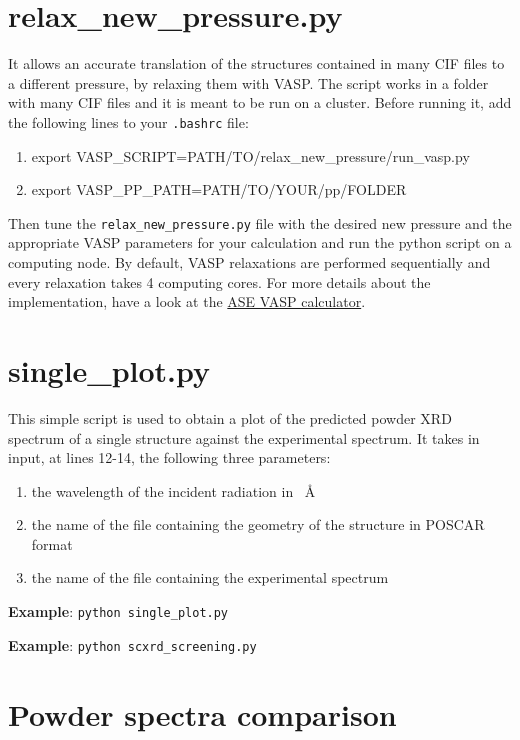 \documentclass{article}
\begin{document}
\section{relax\_new\_pressure.py}
It allows an accurate translation of the structures contained in many CIF files to a different pressure, by relaxing them with VASP. The script works in a folder with many CIF files and it is meant to be run on a cluster. Before running it, add the following lines to your \texttt{.bashrc} file:
\begin{enumerate}
	\item export VASP\_SCRIPT=PATH/TO/relax\_new\_pressure/run\_vasp.py
	\item export VASP\_PP\_PATH=PATH/TO/YOUR/pp/FOLDER
\end{enumerate}
Then tune the \texttt{relax\_new\_pressure.py} file with the desired new pressure and the appropriate VASP parameters for your calculation and run the python script on a computing node. By default, VASP relaxations are performed sequentially and every relaxation takes 4 computing cores. For more details about the implementation, have a look at the \href{https://wiki.fysik.dtu.dk/ase/ase/calculators/vasp.html}{ASE VASP calculator}.

\section{single\_plot.py}
This simple script is used to obtain a plot of the predicted powder XRD spectrum of a single structure against the experimental spectrum. It takes in input, at lines 12-14, the following three parameters:
\begin{enumerate}
	\item the wavelength of the incident radiation in \SI{}{\angstrom}
	\item the name of the file containing the geometry of the structure in POSCAR format
	\item the name of the file containing the experimental spectrum
\end{enumerate}
\textbf{Example}: \texttt{python single\_plot.py}

\vspace{0.2cm}
\noindent \textbf{Example}: \texttt{python scxrd\_screening.py}

\appendix
\appendixpage

\section{Powder spectra comparison}
\label{sec:powderspectracomp}
\end{document}
